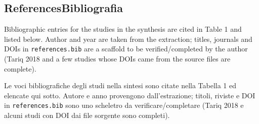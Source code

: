 \documentclass[
  letterpaper,
  DIV=11,
  numbers=noendperiod]{scrartcl}
\begin{document}
\subsection{\texorpdfstring{{References}{Bibliografia}}{ReferencesBibliografia}}\label{referencesbibliografia}

Bibliographic entries for the studies in the synthesis are cited in
Table 1 and listed below. Author and year are taken from the extraction;
titles, journals and DOIs in \texttt{references.bib} are a scaffold to
be verified/completed by the author (Tariq 2018 and a few studies whose
DOIs came from the source files are complete).

Le voci bibliografiche degli studi nella sintesi sono citate nella
Tabella 1 ed elencate qui sotto. Autore e anno provengono
dall'estrazione; titoli, riviste e DOI in \texttt{references.bib} sono
uno scheletro da verificare/completare (Tariq 2018 e alcuni studi con
DOI dai file sorgente sono completi).
\end{document}
